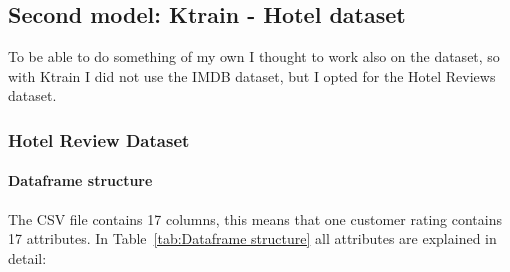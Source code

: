 \subsection{Second model: Ktrain - Hotel dataset}
To be able to do something of my own I thought to work also on the dataset, so with \gls{Ktrain} I did not use the IMDB dataset, but I opted for the Hotel Reviews dataset.

\subsubsection{Hotel Review Dataset}
\paragraph*{Dataframe structure}
The CSV file contains 17 columns, this means that one customer rating contains 17 attributes. In Table~\ref{tab:Dataframe structure} all attributes are explained in detail:

